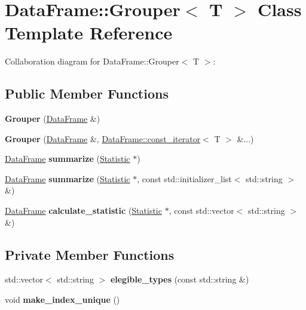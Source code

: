 \hypertarget{classDataFrame_1_1Grouper}{}\section{Data\+Frame\+:\+:Grouper$<$ T $>$ Class Template Reference}
\label{classDataFrame_1_1Grouper}


Collaboration diagram for Data\+Frame\+:\+:Grouper$<$ T $>$\+:
\subsection*{Public Member Functions}
\begin{DoxyCompactItemize}
\item 
\mbox{\label{classDataFrame_1_1Grouper_a474177da006d9ba18bd4bf2fd3809dd4}} 
{\bfseries Grouper} (\hyperlink{classDataFrame}{Data\+Frame} \&)
\item 
\mbox{\label{classDataFrame_1_1Grouper_a007f10e0f9d08889544ad2f826862bbe}} 
{\bfseries Grouper} (\hyperlink{classDataFrame}{Data\+Frame} \&, \hyperlink{classDataFrame_1_1const__iterator}{Data\+Frame\+::const\+\_\+iterator}$<$ T $>$ \&...)
\item 
\mbox{\label{classDataFrame_1_1Grouper_a3347426a8a949290a7ab25235b7877a6}} 
\hyperlink{classDataFrame}{Data\+Frame} {\bfseries summarize} (\hyperlink{classStatistic}{Statistic} $\ast$)
\item 
\mbox{\label{classDataFrame_1_1Grouper_a65232400969fd8e6ee3b72a1e8caa561}} 
\hyperlink{classDataFrame}{Data\+Frame} {\bfseries summarize} (\hyperlink{classStatistic}{Statistic} $\ast$, const std\+::initializer\+\_\+list$<$ std\+::string $>$ \&)
\item 
\mbox{\label{classDataFrame_1_1Grouper_a2c51fb8faf10ba8a3d9f351003d01383}} 
\hyperlink{classDataFrame}{Data\+Frame} {\bfseries calculate\+\_\+statistic} (\hyperlink{classStatistic}{Statistic} $\ast$, const std\+::vector$<$ std\+::string $>$ \&)
\end{DoxyCompactItemize}
\subsection*{Private Member Functions}
\begin{DoxyCompactItemize}
\item 
\mbox{\label{classDataFrame_1_1Grouper_a1a43e23644f25b50984fe9f960561190}} 
std\+::vector$<$ std\+::string $>$ {\bfseries elegible\+\_\+types} (const std\+::string \&)
\item 
\mbox{\label{classDataFrame_1_1Grouper_aa8519a3b8eb2c8fa471a2de09516ba9e}} 
void {\bfseries make\+\_\+index\+\_\+unique} ()
\end{DoxyCompactItemize}
